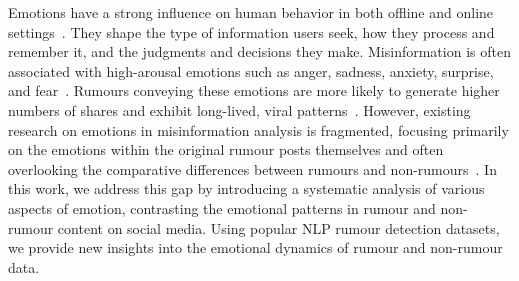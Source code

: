 Emotions have a strong influence on human behavior in both offline and online settings~\citep{emotion_dynamics,Herrando2021EmotionalCA,Ekman1992AnAF}. They shape the type of information users seek, how they process and remember it, and the judgments and decisions they make. Misinformation is often associated with high-arousal emotions such as anger, sadness, anxiety, surprise, and fear~\citep{liu2024emosurvey}. Rumours conveying these emotions are more likely to generate higher numbers of shares and exhibit long-lived, viral patterns~\citep{Prllochs2021EmotionsIO}. However, existing research on emotions in misinformation analysis is fragmented, focusing primarily on the emotions within the original rumour posts themselves and often overlooking the comparative differences between rumours and non-rumours~\citep{Ferrara_2015,emotion_dynamics}. In this work, we address this gap by introducing a systematic analysis of various aspects of emotion, contrasting the emotional patterns in rumour and non-rumour content on social media. Using popular NLP rumour detection datasets, we provide new insights into the emotional dynamics of rumour and non-rumour data.


